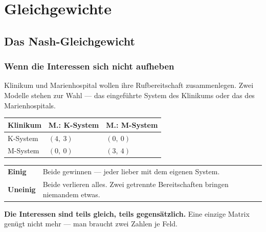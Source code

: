 \part{Gleichgewichte}

\chapter{Das Nash-Gleichgewicht}

\section{Wenn die Interessen sich nicht aufheben}

\begin{merksatz}
Klinikum und Marienhospital wollen ihre Rufbereitschaft zusammenlegen. Zwei Modelle stehen zur Wahl --- das eingeführte System des Klinikums oder das des Marienhospitals.

\begin{center}
{\small
\renewcommand{\arraystretch}{1.6}
\begin{tabular}{@{}P{2.4cm}P{2.4cm}P{2.4cm}@{}}
\toprule
\textbf{Klinikum} & \textbf{M.: K-System} & \textbf{M.: M-System}\\
\midrule
K-System & $(4,\ 3)$ & $(0,\ 0)$\\
M-System & $(0,\ 0)$ & $(3,\ 4)$\\
\bottomrule
\end{tabular}}
\end{center}


\begin{center}
{\small
\renewcommand{\arraystretch}{1.5}
\begin{tabular}{@{}P{2.4cm}P{6.2cm}@{}}
\toprule
\textbf{Einig} & Beide gewinnen --- jeder lieber mit dem eigenen System.\\
\textbf{Uneinig} & Beide verlieren alles. Zwei getrennte Bereitschaften bringen niemandem etwas.\\
\bottomrule
\end{tabular}}
\end{center}

\begin{center}
\begin{minipage}{0.9\textwidth}
\textbf{Die Interessen sind teils gleich, teils gegensätzlich.} Eine einzige Matrix genügt nicht mehr --- man braucht zwei Zahlen je Feld.
\end{minipage}
\end{center}

\begin{center}
\begin{minipage}{0.88\textwidth}
\end{minipage}
\end{center}
\end{merksatz}


